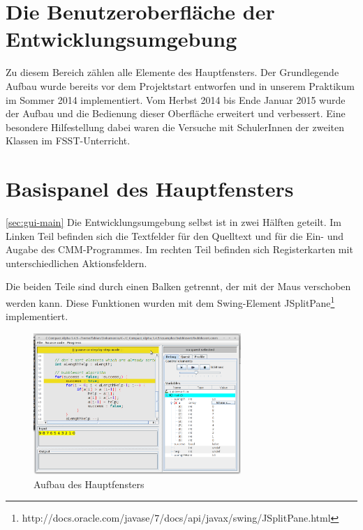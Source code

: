 \section{Die Benutzeroberfläche der Entwicklungsumgebung}
Zu diesem Bereich zählen alle Elemente des Hauptfensters. Der Grundlegende Aufbau wurde bereits vor dem Projektstart entworfen und in unserem Praktikum im Sommer 2014 implementiert. Vom Herbst 2014 bis Ende Januar 2015 wurde der Aufbau und die Bedienung dieser Oberfläche erweitert und verbessert. Eine besondere Hilfestellung dabei waren die Versuche mit SchulerInnen der zweiten Klassen im FSST-Unterricht.





\section{Basispanel des Hauptfensters}
\ref{sec:gui-main}
Die Entwicklungsumgebung selbst ist in zwei Hälften geteilt. Im Linken Teil befinden sich die Textfelder für den Quelltext und für die Ein- und Augabe des CMM-Programmes. Im rechten Teil befinden sich Registerkarten mit unterschiedlichen Aktionsfeldern.

Die beiden Teile sind durch einen Balken getrennt, der mit der Maus verschoben werden kann. Diese Funktionen wurden mit dem Swing-Element JSplitPane\footnote{http://docs.oracle.com/javase/7/docs/api/javax/swing/JSplitPane.html} implementiert.

\begin{figure}[htbp] 
  \centering
     \includegraphics[width=0.7\textwidth]{./media/images/gui/main/CCompactAlpha1-4-5-guimain.png}
  \caption{Aufbau des Hauptfensters}
  \label{fig:gui-main-1}
\end{figure}

